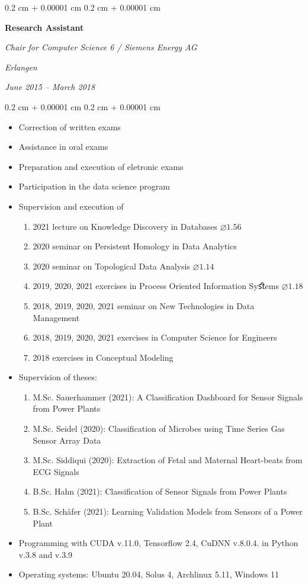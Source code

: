 \documentclass[10pt, letterpaper]{article}
\newenvironment{highlights}{
    \begin{itemize}[
        topsep=0.10 cm,
        parsep=0.10 cm,
        partopsep=0pt,
        itemsep=0pt,
        leftmargin=0.4 cm + 10pt
    ]
}{
    \end{itemize}
}
\newenvironment{onecolentry}{
    \begin{adjustwidth}{
        0.2 cm + 0.00001 cm
    }{
        0.2 cm + 0.00001 cm
    }
}{
    \end{adjustwidth}
}
\newenvironment{twocolentry}[2][]{
    \onecolentry
    \def\secondColumn{#2}
    \setcolumnwidth{\fill, 4.5 cm}
    \begin{paracol}{2}
}{
    \switchcolumn \raggedleft \secondColumn
    \end{paracol}
    \endonecolentry
}
\begin{document}
\begin{twocolentry}{
    \textit{Erlangen}    
    
    \textit{June 2015 – March 2018}}
    \textbf{Research Assistant}
    
    \textit{Chair for Computer Science 6 / Siemens Energy AG}
\end{twocolentry}

\vspace{0.10 cm}
\begin{onecolentry}
	\begin{highlights}
		\item Correction of written exams
        \item Assistance in oral exams
        \item Preparation and execution of eletronic exams
        \item Participation in the data science program
        \item Supervision and execution of
        \begin{enumerate}
            \item 2021 lecture on Knowledge Discovery in Databases $\varnothing 1.56$
            \item 2020 seminar on Persistent Homology in Data Analytics
            \item 2020 seminar on Topological Data Analysis $\varnothing 1.14$
            \item 2019, 2020, 2021 exercises in Process Oriented Information Syﬆems $\varnothing 1.18$
            \item 2018, 2019, 2020, 2021 seminar on New Technologies in Data Management
            \item 2018, 2019, 2020, 2021 exercises in Computer Science for Engineers
            \item 2018 exercises in Conceptual Modeling
        \end{enumerate}
        \item Supervision of theses:
        \begin{enumerate}
            \item M.Sc. Sauerhammer (2021): A Classification Dashboard for Sensor Signals from Power Plants
            \item M.Sc. Seidel (2020): Classification of Microbes using Time Series Gas Sensor Array Data
            \item M.Sc. Siddiqui (2020): Extraction of Fetal and Maternal Heart-beats from ECG Signals
            \item B.Sc. Hahn (2021): Classification of Sensor Signals from Power Plants
            \item B.Sc. Schäfer (2021): Learning Validation Models from Sensors of a
Power Plant
        \end{enumerate}
        \item Programming with CUDA v.11.0, Tensorflow 2.4, CuDNN v.8.0.4. in Python v.3.8 and v.3.9
        \item Operating systems: Ubuntu 20.04, Solus 4, Archlinux 5.11, Windows 11
	\end{highlights}
\end{onecolentry}
\vspace{0.2 cm}
\end{document}
